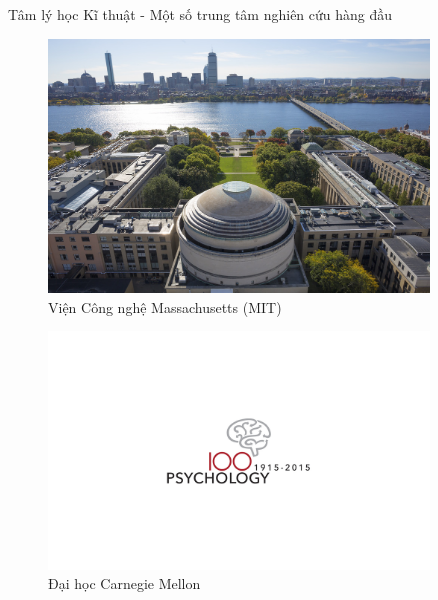 \documentclass[../main.tex]{subfiles}
\begin{document}
\begin{frame}{Tâm lý học Kĩ thuật - Một số trung tâm nghiên cứu hàng đầu}
    \begin{minipage}{0.5\textwidth}
        \begin{figure}
            \centering
            \includegraphics[width=0.9\textwidth]{anh/MIT.jpg}
            \caption{Viện Công nghệ Massachusetts (MIT)}
        \end{figure}
    \end{minipage}\hfill
    \begin{minipage}{0.5\textwidth}
        \begin{figure}
            \centering
            \includegraphics[width=0.9\textwidth]{anh/CMU.jpg}
            \caption{Đại học Carnegie Mellon}
        \end{figure}
    \end{minipage}
\end{frame}
\end{document}
